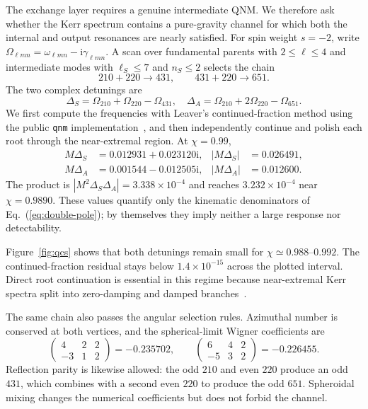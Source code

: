 \documentclass[
 reprint,
 amsmath,amssymb,
 aps,
 prl,
 superscriptaddress,
 nofootinbib
]{revtex4-2}
\newcommand{\Om}{\Omega}
\newcommand{\ii}{\mathrm{i}}
\begin{document}
The exchange layer requires a genuine intermediate QNM. We therefore ask
whether the Kerr spectrum contains a pure-gravity channel for which both the
internal and output resonances are nearly satisfied. For spin weight
\(s=-2\), write \(\Om_{\ell mn}=\omega_{\ell mn}-\ii\gamma_{\ell mn}\). A scan
over fundamental parents with \(2\leq\ell\leq4\) and intermediate modes with
\(\ell_S\leq7\) and \(n_S\leq2\) selects the chain
\begin{equation}
210+220\rightarrow431,\qquad
431+220\rightarrow651.
\label{eq:chain}
\end{equation}
The two complex detunings are
\begin{equation}
\Delta_S=\Om_{210}+\Om_{220}-\Om_{431},\quad
\Delta_A=\Om_{210}+2\Om_{220}-\Om_{651}.
\label{eq:detunings}
\end{equation}
We first compute the frequencies with Leaver's continued-fraction method using
the public \texttt{qnm} implementation~\cite{Stein2019}, and then independently
continue and polish each root through the near-extremal region. At
\(\chi=0.99\),
\begin{align}
M\Delta_S&=0.012931+0.023120\ii,
&|M\Delta_S|&=0.026491, \nonumber\\
M\Delta_A&=0.001544-0.012505\ii,
&|M\Delta_A|&=0.012600 .
\label{eq:numbers}
\end{align}
The product is \(|M^2\Delta_S\Delta_A|=3.338\times10^{-4}\) and reaches
\(3.232\times10^{-4}\) near \(\chi=0.9890\). These values quantify only the
kinematic denominators of Eq.~(\ref{eq:double-pole}); by themselves they imply
neither a large response nor detectability.

Figure~\ref{fig:qcs} shows that both detunings remain small for
\(\chi\simeq0.988\)--\(0.992\). The continued-fraction residual stays below
\(1.4\times10^{-15}\) across the plotted interval. Direct root continuation is
essential in this regime because near-extremal Kerr spectra split into
zero-damping and damped branches~\cite{YangEtAl2013}.

The same chain also passes the angular selection rules. Azimuthal number is
conserved at both vertices, and the spherical-limit Wigner coefficients are
\[
\begin{pmatrix}4&2&2\\-3&1&2\end{pmatrix}
=-0.235702,\qquad
\begin{pmatrix}6&4&2\\-5&3&2\end{pmatrix}
=-0.226455 .
\]
Reflection parity is likewise allowed: the odd \(210\) and even \(220\) produce
an odd \(431\), which combines with a second even \(220\) to produce the odd
\(651\). Spheroidal mixing changes the numerical coefficients but does not
forbid the channel.
\end{document}
